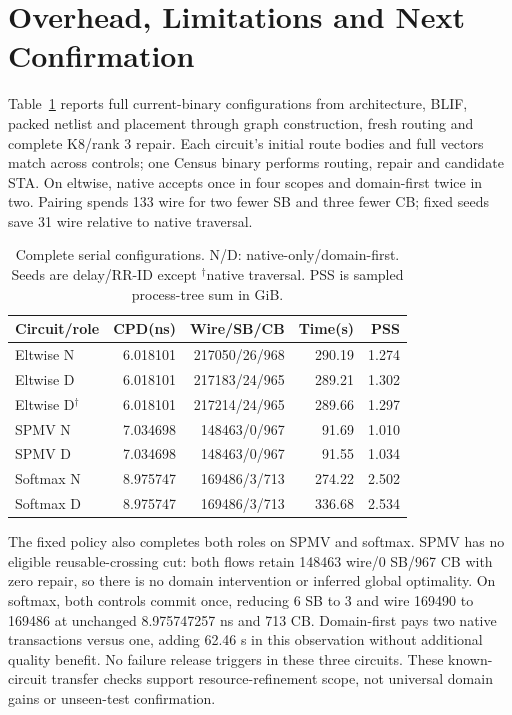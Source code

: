 \documentclass[conference,10pt]{IEEEtran}
\begin{document}
\section{Overhead, Limitations and Next Confirmation}
Table~\ref{tab:completecost} reports full current-binary configurations from architecture, BLIF, packed netlist and placement through graph construction, fresh routing and complete K8/rank 3 repair. Each circuit's initial route bodies and full vectors match across controls; one Census binary performs routing, repair and candidate STA. On eltwise, native accepts once in four scopes and domain-first twice in two. Pairing spends 133 wire for two fewer SB and three fewer CB; fixed seeds save 31 wire relative to native traversal.
\begin{table}[t]
\centering\footnotesize\setlength{\tabcolsep}{3pt}
\caption{Complete serial configurations. N/D: native-only/domain-first. Seeds are delay/RR-ID except $^\dagger$native traversal. PSS is sampled process-tree sum in GiB.}
\label{tab:completecost}
\begin{tabular}{lrrrr}\hline
Circuit/role & CPD(ns) & Wire/SB/CB & Time(s) & PSS\\\hline
Eltwise N&6.018101&217050/26/968&290.19&1.274\\
Eltwise D&6.018101&217183/24/965&289.21&1.302\\
Eltwise D$^\dagger$&6.018101&217214/24/965&289.66&1.297\\
SPMV N&7.034698&148463/0/967&91.69&1.010\\
SPMV D&7.034698&148463/0/967&91.55&1.034\\
Softmax N&8.975747&169486/3/713&274.22&2.502\\
Softmax D&8.975747&169486/3/713&336.68&2.534\\\hline
\end{tabular}
\end{table}

The fixed policy also completes both roles on SPMV and softmax. SPMV has no eligible reusable-crossing cut: both flows retain 148463 wire/0 SB/967 CB with zero repair, so there is no domain intervention or inferred global optimality. On softmax, both controls commit once, reducing 6 SB to 3 and wire 169490 to 169486 at unchanged 8.975747257 ns and 713 CB. Domain-first pays two native transactions versus one, adding 62.46 s in this observation without additional quality benefit. No failure release triggers in these three circuits. These known-circuit transfer checks support resource-refinement scope, not universal domain gains or unseen-test confirmation.
\end{document}
